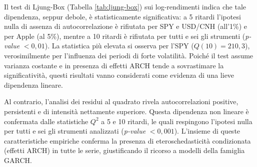Il test di Ljung-Box (Tabella \ref{tab:ljung-box}) sui log-rendimenti indica che tale dipendenza, seppur debole, è statisticamente significativa: a 5 ritardi l'ipotesi nulla 
di assenza di autocorrelazione è rifiutata per SPY e USD/CNH (all'1\%) e per Apple (al 5\%), mentre a 10 ritardi è rifiutata per tutti e sei gli strumenti (\emph{p-value} $< 0,01$). 
La statistica più elevata si osserva per l'SPY ($Q(10) = 210,3$), verosimilmente per l'influenza dei periodi di forte volatilità. 
Poiché il test assume varianza costante e in presenza di effetti ARCH tende a sovrastimare la significatività, questi risultati vanno considerati come evidenza di una 
lieve dipendenza lineare. 

Al contrario, l'analisi dei residui al quadrato rivela autocorrelazioni positive, persistenti e di intensità nettamente superiore. Questa dipendenza non lineare è confermata 
dalle statistiche $Q^2$ a 5 e 10 ritardi, le quali respingono l'ipotesi nulla per tutti e sei gli strumenti analizzati (\emph{p-value} $< 0,001$). L'insieme di queste 
caratteristiche empiriche conferma la presenza di eteroschedasticità condizionata (effetti ARCH) in tutte le serie, giustificando il ricorso a modelli della famiglia GARCH.

